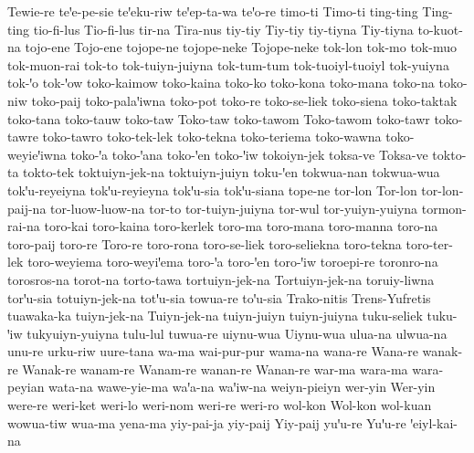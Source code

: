 {Tewie-re
teꞌe-pe-sie
teꞌeku-riw
teꞌep-ta-wa
teꞌo-re
timo-ti
Timo-ti
ting-ting
Ting-ting
tio-fi-lus
Tio-fi-lus
tir-na
Tira-nus
tiy-tiy
Tiy-tiy
tiy-tiyna
Tiy-tiyna
to-kuot-na
tojo-ene
Tojo-ene
tojope-ne
tojope-neke
Tojope-neke
tok-lon
tok-mo
tok-muo
tok-muon-rai
tok-to
tok-tuiyn-juiyna
tok-tum-tum
tok-tuoiyl-tuoiyl
tok-yuiyna
tok-ꞌo
tok-ꞌow
toko-kaimow
toko-kaina
toko-ko
toko-kona
toko-mana
toko-na
toko-niw
toko-paij
toko-palaꞌiwna
toko-pot
toko-re
toko-se-liek
toko-siena
toko-taktak
toko-tana
toko-tauw
toko-taw
Toko-taw
toko-tawom
Toko-tawom
toko-tawr
toko-tawre
toko-tawro
toko-tek-lek
toko-tekna
toko-teriema
toko-wawna
toko-weyieꞌiwna
toko-ꞌa
toko-ꞌana
toko-ꞌen
toko-ꞌiw
tokoiyn-jek
toksa-ve
Toksa-ve
tokto-ta
tokto-tek
toktuiyn-jek-na
toktuiyn-juiyn
toku-ꞌen
tokwua-nan
tokwua-wua
tokꞌu-reyeiyna
tokꞌu-reyieyna
tokꞌu-sia
tokꞌu-siana
tope-ne
tor-lon
Tor-lon
tor-lon-paij-na
tor-luow-luow-na
tor-to
tor-tuiyn-juiyna
tor-wul
tor-yuiyn-yuiyna
tormon-rai-na
toro-kai
toro-kaina
toro-kerlek
toro-ma
toro-mana
toro-manna
toro-na
toro-paij
toro-re
Toro-re
toro-rona
toro-se-liek
toro-seliekna
toro-tekna
toro-ter-lek
toro-weyiema
toro-weyiꞌema
toro-ꞌa
toro-ꞌen
toro-ꞌiw
toroepi-re
toronro-na
torosros-na
torot-na
torto-tawa
tortuiyn-jek-na
Tortuiyn-jek-na
toruiy-liwna
torꞌu-sia
totuiyn-jek-na
totꞌu-sia
towua-re
toꞌu-sia
Trako-nitis
Trens-Yufretis
tuawaka-ka
tuiyn-jek-na
Tuiyn-jek-na
tuiyn-juiyn
tuiyn-juiyna
tuku-seliek
tuku-ꞌiw
tukyuiyn-yuiyna
tulu-lul
tuwua-re
uiynu-wua
Uiynu-wua
ulua-na
ulwua-na
unu-re
urku-riw
uure-tana
wa-ma
wai-pur-pur
wama-na
wana-re
Wana-re
wanak-re
Wanak-re
wanam-re
Wanam-re
wanan-re
Wanan-re
war-ma
wara-ma
wara-peyian
wata-na
wawe-yie-ma
waꞌa-na
waꞌiw-na
weiyn-pieiyn
wer-yin
Wer-yin
were-re
weri-ket
weri-lo
weri-nom
weri-re
weri-ro
wol-kon
Wol-kon
wol-kuan
wowua-tiw
wua-ma
yena-ma
yiy-pai-ja
yiy-paij
Yiy-paij
yuꞌu-re
Yuꞌu-re
ꞌeiyl-kai-na}
